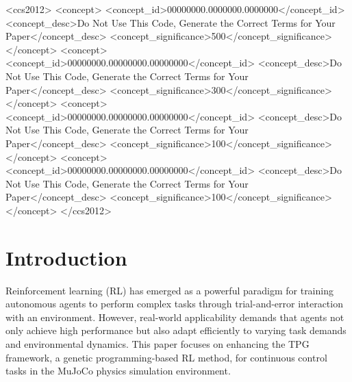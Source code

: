 \documentclass[sigconf]{acmart}
\begin{document}
\begin{CCSXML}
<ccs2012>
 <concept>
  <concept_id>00000000.0000000.0000000</concept_id>
  <concept_desc>Do Not Use This Code, Generate the Correct Terms for Your Paper</concept_desc>
  <concept_significance>500</concept_significance>
 </concept>
 <concept>
  <concept_id>00000000.00000000.00000000</concept_id>
  <concept_desc>Do Not Use This Code, Generate the Correct Terms for Your Paper</concept_desc>
  <concept_significance>300</concept_significance>
 </concept>
 <concept>
  <concept_id>00000000.00000000.00000000</concept_id>
  <concept_desc>Do Not Use This Code, Generate the Correct Terms for Your Paper</concept_desc>
  <concept_significance>100</concept_significance>
 </concept>
 <concept>
  <concept_id>00000000.00000000.00000000</concept_id>
  <concept_desc>Do Not Use This Code, Generate the Correct Terms for Your Paper</concept_desc>
  <concept_significance>100</concept_significance>
 </concept>
</ccs2012>
\end{CCSXML}





\maketitle

\section{Introduction}
Reinforcement learning (RL) has emerged as a powerful paradigm
for training autonomous agents to perform complex tasks through 
trial-and-error interaction with an environment. However, real-world applicability 
demands that agents not only achieve high performance but also adapt efficiently 
to varying task demands and environmental dynamics. This paper focuses on 
enhancing the TPG framework, a genetic programming-based RL method, 
for continuous control tasks in the MuJoCo physics simulation environment. 
\end{document}
